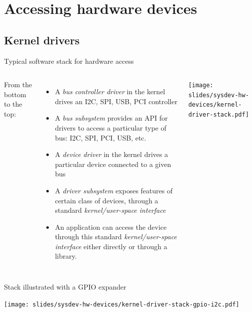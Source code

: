 \section{Accessing hardware devices}

\subsection{Kernel drivers}

\begin{frame}{Typical software stack for hardware access}
  \begin{columns}
    From the bottom to the top:
    \begin{itemize}
    \item A {\em bus controller driver} in the kernel drives an I2C,
      SPI, USB, PCI controller
    \item A {\em bus subsystem} provides an API for drivers to access
      a particular type of bus: I2C, SPI, PCI, USB, etc.
    \item A {\em device driver} in the kernel drives a particular
      device connected to a given bus
    \item A {\em driver subsystem} exposes features of certain class
      of devices, through a standard {\em kernel/user-space interface}
    \item An application can access the device through this standard {\em
        kernel/user-space interface} either directly or through a
      library.
    \end{itemize}
    \begin{center}
      \texttt{[image: slides/sysdev-hw-devices/kernel-driver-stack.pdf]}
    \end{center}
  \end{columns}
\end{frame}

\begin{frame}{Stack illustrated with a GPIO expander}
  \begin{center}
    \texttt{[image: slides/sysdev-hw-devices/kernel-driver-stack-gpio-i2c.pdf]}
  \end{center}
\end{frame}

